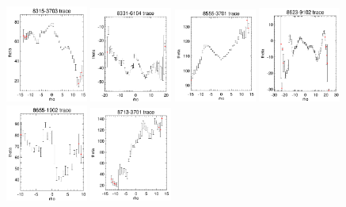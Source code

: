 \documentclass[fleqn,usenatbib]{mnras}
\begin{document}
\begin{figure}
    \includegraphics[width=0.24\textwidth]{Images/SN1-MC250/CPSBs/8315-3703-1-250.png}
    \includegraphics[width=0.24\textwidth]{Images/SN1-MC250/CPSBs/8331-6104-1-250.png}
    \includegraphics[width=0.24\textwidth]{Images/SN1-MC250/CPSBs/8555-3701-1-250.png}
    \includegraphics[width=0.24\textwidth]{Images/SN1-MC250/CPSBs/8623-9102-1-250.png}
    \includegraphics[width=0.24\textwidth]{Images/SN1-MC250/CPSBs/8655-1902-1-250.png}
    \includegraphics[width=0.24\textwidth]{Images/SN1-MC250/CPSBs/8713-3701-1-250.png}

\end{figure}
\end{document}
